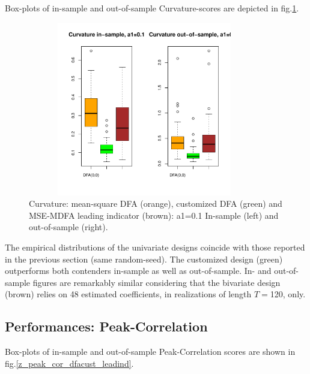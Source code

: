 \documentclass[a4paper]{book}
\begin{document}
Box-plots of in-sample and out-of-sample Curvature-scores are depicted in fig.\ref{z_curv_dfacust_leadind}.
\begin{figure}[H]\begin{center}\includegraphics[height=3in, width=4in]{z_curv_dfacust_leadind}\caption{Curvature: mean-square DFA (orange), customized DFA (green) and MSE-MDFA leading indicator (brown): a1=0.1 In-sample (left) and out-of-sample (right).\label{z_curv_dfacust_leadind}}\end{center}\end{figure}The empirical distributions of the univariate designs coincide with those reported in the previous section (same random-seed). The customized design (green) outperforms both contenders in-sample as well as out-of-sample. In- and out-of-sample figures are remarkably similar considering that the bivariate design (brown) relies on 48 estimated coefficients, in realizations of length $T=$120, only. 



\subsection{Performances: Peak-Correlation}

Box-plots of in-sample and out-of-sample Peak-Correlation scores are shown in fig.\ref{z_peak_cor_dfacust_leadind}.
\end{document}
